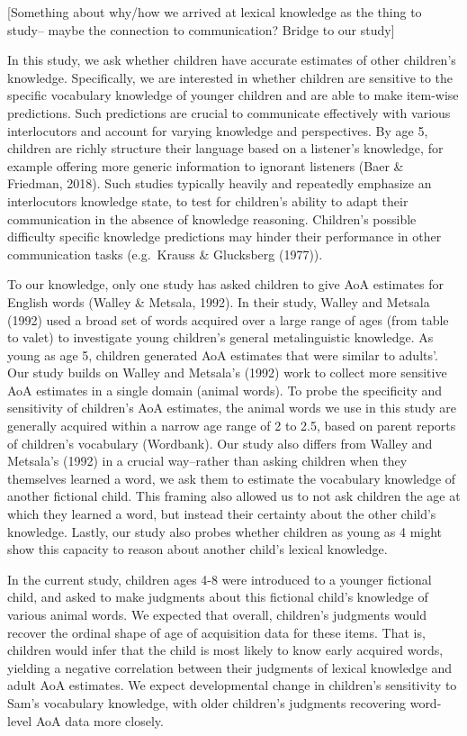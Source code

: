 \documentclass[10pt, letterpaper]{article}
\begin{document}
{[}Something about why/how we arrived at lexical knowledge as the thing
to study-- maybe the connection to communication? Bridge to our study{]}

In this study, we ask whether children have accurate estimates of other
children's knowledge. Specifically, we are interested in whether
children are sensitive to the specific vocabulary knowledge of younger
children and are able to make item-wise predictions. Such predictions
are crucial to communicate effectively with various interlocutors and
account for varying knowledge and perspectives. By age 5, children are
richly structure their language based on a listener's knowledge, for
example offering more generic information to ignorant listeners (Baer \&
Friedman, 2018). Such studies typically heavily and repeatedly emphasize
an interlocutors knowledge state, to test for children's ability to
adapt their communication in the absence of knowledge reasoning.
Children's possible difficulty specific knowledge predictions may hinder
their performance in other communication tasks (e.g.~Krauss \&
Glucksberg (1977)).

To our knowledge, only one study has asked children to give AoA
estimates for English words (Walley \& Metsala, 1992). In their study,
Walley and Metsala (1992) used a broad set of words acquired over a
large range of ages (from table to valet) to investigate young
children's general metalinguistic knowledge. As young as age 5, children
generated AoA estimates that were similar to adults'. Our study builds
on Walley and Metsala's (1992) work to collect more sensitive AoA
estimates in a single domain (animal words). To probe the specificity
and sensitivity of children's AoA estimates, the animal words we use in
this study are generally acquired within a narrow age range of 2 to 2.5,
based on parent reports of children's vocabulary (Wordbank). Our study
also differs from Walley and Metsala's (1992) in a crucial way--rather
than asking children when they themselves learned a word, we ask them to
estimate the vocabulary knowledge of another fictional child. This
framing also allowed us to not ask children the age at which they
learned a word, but instead their certainty about the other child's
knowledge. Lastly, our study also probes whether children as young as 4
might show this capacity to reason about another child's lexical
knowledge.

In the current study, children ages 4-8 were introduced to a younger
fictional child, and asked to make judgments about this fictional
child's knowledge of various animal words. We expected that overall,
children's judgments would recover the ordinal shape of age of
acquisition data for these items. That is, children would infer that the
child is most likely to know early acquired words, yielding a negative
correlation between their judgments of lexical knowledge and adult AoA
estimates. We expect developmental change in children's sensitivity to
Sam's vocabulary knowledge, with older children's judgments recovering
word-level AoA data more closely.
\end{document}
